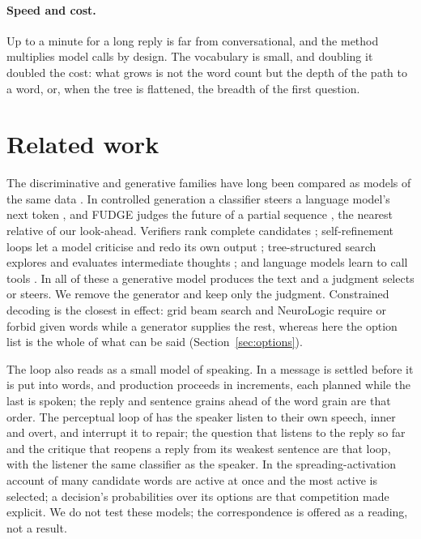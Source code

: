 \documentclass[10pt,twocolumn]{article}
\begin{document}
\paragraph{Speed and cost.} Up to a minute for a long reply is far from conversational, and the
method multiplies model calls by design. The vocabulary is small, and doubling it doubled the cost:
what grows is not the word count but the depth of the path to a word, or, when the tree is
flattened, the breadth of the first question.

\section{Related work}

The discriminative and generative families have long been compared as models of the same data
\citep{ng2001discriminative}. In controlled generation a classifier steers a language model's next
token \citep{dathathri2020pplm,krause2021gedi}, and FUDGE judges the future of a partial sequence
\citep{yang2021fudge}, the nearest relative of our look-ahead. Verifiers rank complete candidates
\citep{cobbe2021verifiers}; self-refinement loops let a model criticise and redo its own output
\citep{madaan2023selfrefine}; tree-structured search explores and evaluates intermediate thoughts
\citep{yao2023tot}; and language models learn to call tools \citep{schick2023toolformer}. In all of
these a generative model produces the text and a judgment selects or steers. We remove the generator
and keep only the judgment. Constrained decoding is the closest in effect: grid beam search
\citep{hokamp2017constrained} and NeuroLogic \citep{lu2021neurologic} require or forbid given words
while a generator supplies the rest, whereas here the option list is the whole of what can be said
(Section~\ref{sec:options}).

The loop also reads as a small model of speaking. In \citet{levelt1989speaking} a message is settled
before it is put into words, and production proceeds in increments, each planned while the last is
spoken; the reply and sentence grains ahead of the word grain are that order. The perceptual loop of
\citet{levelt1983monitoring} has the speaker listen to their own speech, inner and overt, and
interrupt it to repair; the question that listens to the reply so far and the critique that reopens
a reply from its weakest sentence are that loop, with the listener the same classifier as the
speaker. In the spreading-activation account of \citet{dell1986spreading} many candidate words are
active at once and the most active is selected; a decision's probabilities over its options are that
competition made explicit. We do not test these models; the correspondence is offered as a reading,
not a result.
\end{document}
